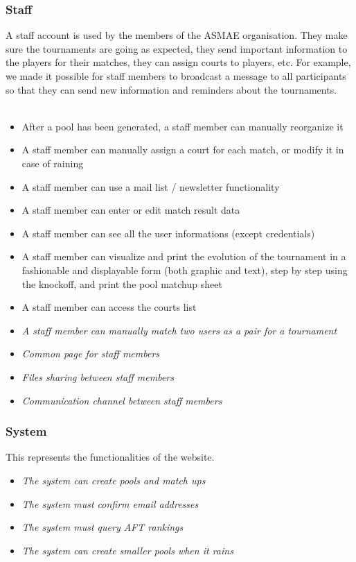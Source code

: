 \documentclass[a4paper, 12pt]{article}
\begin{document}
\subsubsection*{Staff} 
    A staff account is used by the members of the ASMAE organisation. They make sure the tournaments are going as expected, they send important information to the players for their matches, they can assign courts to players, etc. For example, we made it possible for staff members to  broadcast a message to all participants so that they can send new information and reminders about the tournaments.\\\\
    
    \begin{itemize}
    	\item After a pool has been generated, a staff member can manually reorganize it
		\item A staff member can manually assign a court for each match, or modify it in case of raining
		\item A staff member can use a mail list / newsletter functionality
		\item A staff member can enter or edit match result data
		\item A staff member can see all the user informations (except credentials)
		\item A staff member can visualize and print the evolution of the tournament in a fashionable and displayable form (both graphic and text), step by step using the knockoff, and print the pool matchup sheet
		\item A staff member can access the courts list
		\item \textit{A staff member can manually match two users as a pair for a tournament}
		\item \textit{Common page for staff members}
		\item \textit{Files sharing between staff members}
		\item \textit{Communication channel between staff members}
    \end{itemize}
    
\subsubsection*{System}   
     This represents the functionalities of the website.
    \begin{itemize}
    	\item \textit{The system can create pools and match ups}
		\item \textit{The system must confirm email addresses}
		\item \textit{The system must query AFT rankings}
		\item \textit{The system can create smaller pools when it rains}
    \end{itemize}
    
\end{document}
